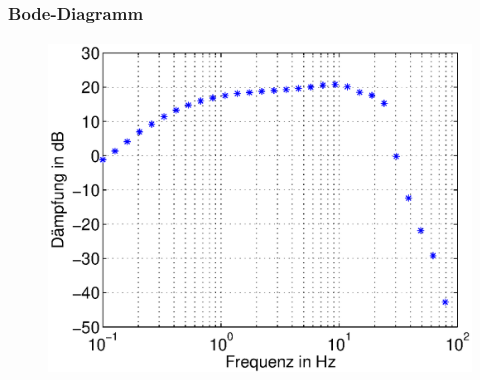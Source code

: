 \begin{frame}
\frametitle{Bode-Diagramm}
\framesubtitle{}
    \begin{figure}[H]
    \begin{center}
            \includegraphics[scale=0.4]{./img/plots/Auf_5_bode_db.eps}
    \end{center}
    \end{figure}
\end{frame}


